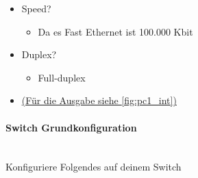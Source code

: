 \documentclass{article}
\newcommand{\paragraphlb}[1]{\paragraph{#1}\mbox{}\\}{}
\begin{document}
\begin{enumerate}
\begin{itemize}
			\begin{itemize}
				\item{Die MAC Adress ist: \texttt{0004.9A92.3901}}
			\end{itemize}
			\item[c.]{Speed?}
			\begin{itemize}
				\item{Da es Fast Ethernet ist 100.000 Kbit}
			\end{itemize}
			\item[d.]{Duplex?}
			\begin{itemize}
				\item{Full-duplex}
			\end{itemize}
			\item[]{\hyperref[fig:pc1_int]{(Für die Ausgabe siehe \ref{fig:pc1_int})}}
		\end{itemize}
	\end{enumerate}
	\paragraphlb{Switch Grundkonfiguration}
	\label{sub:grund_config}
	Konfiguriere Folgendes auf deinem Switch
\end{document}
